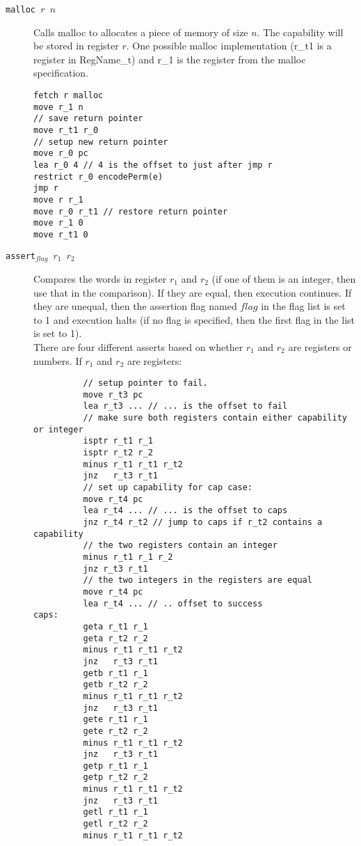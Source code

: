 \documentclass[a4paper]{article}
\newcommand{\var}[1]{\mathit{#1}}
\begin{document}
\begin{description}
              \item[\texttt{malloc $r$ $n$}] Calls malloc to allocates a piece of memory of size $n$. The capability will be stored in register $r$. 
One possible malloc implementation (r\_t1 is a register in RegName\_t) and r\_1 is the register from the malloc specification.
\begin{lstlisting}
fetch r malloc
move r_1 n 
// save return pointer
move r_t1 r_0 
// setup new return pointer
move r_0 pc
lea r_0 4 // 4 is the offset to just after jmp r
restrict r_0 encodePerm(e)
jmp r
move r r_1
move r_0 r_t1 // restore return pointer
move r_1 0
move r_t1 0
\end{lstlisting}
              \item[\texttt{assert$_{\var{flag}}$ $r_1$ $r_2$}] Compares the words in register $r_1$ and $r_2$ (if one of them is an integer, then use that in the comparison). If they are equal, then execution continues. If they are unequal, then the assertion flag named $\var{flag}$ in the flag list is set to 1 and execution halts (if no flag is specified, then the first flag in the list is set to 1).\\
There are four different asserts based on whether $r_1$ and $r_2$ are registers or numbers. If $r_1$ and $r_2$ are registers:
\begin{lstlisting}
          // setup pointer to fail.
          move r_t3 pc
          lea r_t3 ... // ... is the offset to fail
          // make sure both registers contain either capability or integer
          isptr r_t1 r_1
          isptr r_t2 r_2
          minus r_t1 r_t1 r_t2
          jnz   r_t3 r_t1
          // set up capability for cap case:
          move r_t4 pc
          lea r_t4 ... // ... is the offset to caps
          jnz r_t4 r_t2 // jump to caps if r_t2 contains a capability
          // the two registers contain an integer
          minus r_t1 r_1 r_2
          jnz r_t3 r_t1
          // the two integers in the registers are equal
          move r_t4 pc
          lea r_t4 ... // .. offset to success
caps:
          geta r_t1 r_1
          geta r_t2 r_2
          minus r_t1 r_t1 r_t2
          jnz   r_t3 r_t1          
          getb r_t1 r_1
          getb r_t2 r_2
          minus r_t1 r_t1 r_t2
          jnz   r_t3 r_t1          
          gete r_t1 r_1
          gete r_t2 r_2
          minus r_t1 r_t1 r_t2
          jnz   r_t3 r_t1          
          getp r_t1 r_1
          getp r_t2 r_2
          minus r_t1 r_t1 r_t2
          jnz   r_t3 r_t1          
          getl r_t1 r_1
          getl r_t2 r_2
          minus r_t1 r_t1 r_t2

\end{lstlisting}
\end{description}
\end{document}
